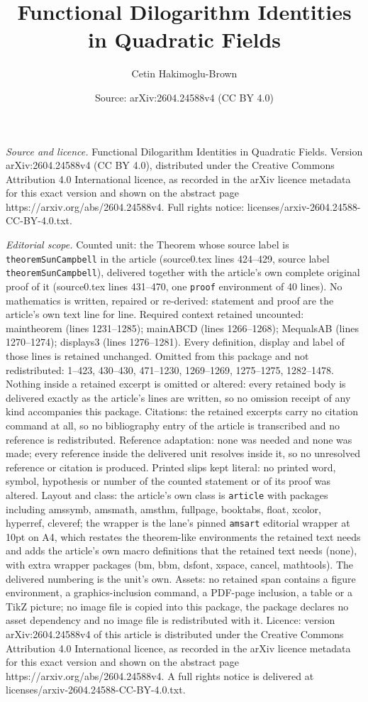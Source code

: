 \documentclass[10pt,a4paper]{amsart}
\title[Functional Dilogarithm Identities in Quadratic Fields]{Functional Dilogarithm Identities in Quadratic Fields}
\author{Cetin Hakimoglu-Brown}
\date{Source: arXiv:2604.24588v4 (CC BY 4.0)}
\begin{document}
\maketitle

\noindent\emph{Source and licence.} Functional Dilogarithm Identities in Quadratic Fields. Version arXiv:2604.24588v4 (CC BY 4.0), distributed under the Creative Commons Attribution 4.0 International licence, as recorded in the arXiv licence metadata for this exact version and shown on the abstract page https://arxiv.org/abs/2604.24588v4. Full rights notice: licenses/arxiv-2604.24588-CC-BY-4.0.txt.\par\smallskip

\noindent\textit{Editorial scope.} Counted unit: the Theorem whose source label is \texttt{theoremSunCampbell} in the article (source0.tex lines 424--429, source label \texttt{theoremSunCampbell}), delivered together with the article's own complete original proof of it (source0.tex lines 431--470, one \texttt{proof} environment of 40 lines). No mathematics is written, repaired or re-derived: statement and proof are the article's own text line for line. Required context retained uncounted: maintheorem (lines 1231--1285); mainABCD (lines 1266--1268); MequalsAB (lines 1270--1274); displays3 (lines 1276--1281). Every definition, display and label of those lines is retained unchanged. Omitted from this package and not redistributed: 1--423, 430--430, 471--1230, 1269--1269, 1275--1275, 1282--1478. Nothing inside a retained excerpt is omitted or altered: every retained body is delivered exactly as the article's lines are written, so no omission receipt of any kind accompanies this package. Citations: the retained excerpts carry no citation command at all, so no bibliography entry of the article is transcribed and no reference is redistributed. Reference adaptation: none was needed and none was made; every reference inside the delivered unit resolves inside it, so no unresolved reference or citation is produced. Printed slips kept literal: no printed word, symbol, hypothesis or number of the counted statement or of its proof was altered. Layout and class: the article's own class is \texttt{article} with packages including amssymb, amsmath, amsthm, fullpage, booktabs, float, xcolor, hyperref, cleveref; the wrapper is the lane's pinned \texttt{amsart} editorial wrapper at 10pt on A4, which restates the theorem-like environments the retained text needs and adds the article's own macro definitions that the retained text needs (none), with extra wrapper packages (bm, bbm, dsfont, xspace, cancel, mathtools). The delivered numbering is the unit's own. Assets: no retained span contains a figure environment, a graphics-inclusion command, a PDF-page inclusion, a table or a TikZ picture; no image file is copied into this package, the package declares no asset dependency and no image file is redistributed with it. Licence: version arXiv:2604.24588v4 of this article is distributed under the Creative Commons Attribution 4.0 International licence, as recorded in the arXiv licence metadata for this exact version and shown on the abstract page https://arxiv.org/abs/2604.24588v4. A full rights notice is delivered at licenses/arxiv-2604.24588-CC-BY-4.0.txt. 
\end{document}
